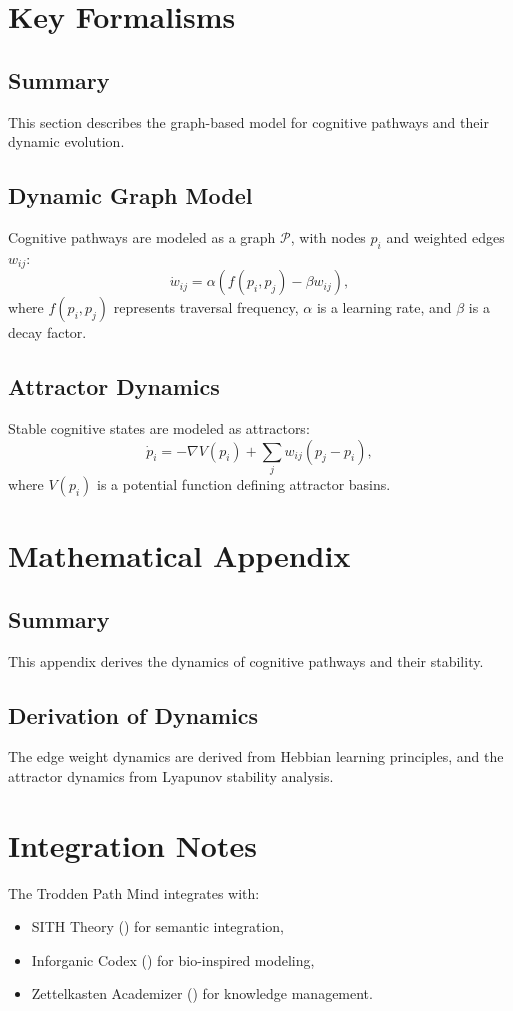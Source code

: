 \documentclass[11pt,oneside]{memoir}
\theoremstyle{plain}
\begin{document}
\section{Key Formalisms}
\subsection{Summary}
This section describes the graph-based model for cognitive pathways and their dynamic evolution.

\subsection{Dynamic Graph Model}
Cognitive pathways are modeled as a graph \(\mathcal{P}\), with nodes \(p_i\) and weighted edges \(w_{ij}\):
\begin{equation}
    \dot{w}_{ij} = \alpha (f(p_i, p_j) - \beta w_{ij}),
\end{equation}
where \(f(p_i, p_j)\) represents traversal frequency, \(\alpha\) is a learning rate, and \(\beta\) is a decay factor.

\subsection{Attractor Dynamics}
Stable cognitive states are modeled as attractors:
\begin{equation}
    \dot{p}_i = -\nabla V(p_i) + \sum_{j} w_{ij} (p_j - p_i),
\end{equation}
where \(V(p_i)\) is a potential function defining attractor basins.

\section{Mathematical Appendix}
\subsection{Summary}
This appendix derives the dynamics of cognitive pathways and their stability.

\subsection{Derivation of Dynamics}
The edge weight dynamics are derived from Hebbian learning principles, and the attractor dynamics from Lyapunov stability analysis.

\section{Integration Notes}
The Trodden Path Mind integrates with:
\begin{itemize}
    \item SITH Theory () for semantic integration,
    \item Inforganic Codex () for bio-inspired modeling,
    \item Zettelkasten Academizer () for knowledge management.
\end{itemize}
\end{document}
